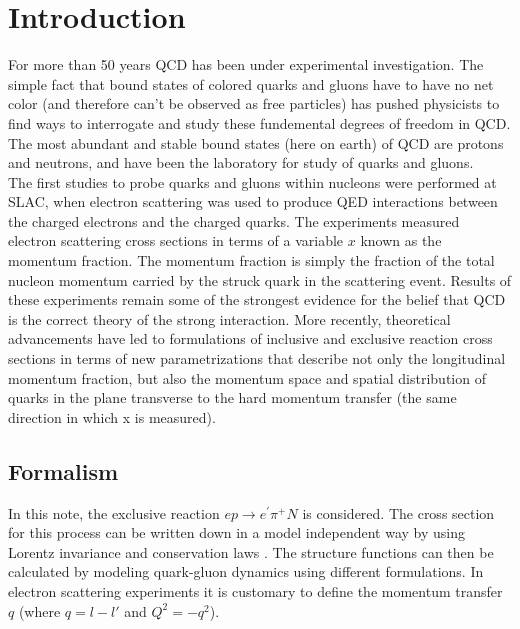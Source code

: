 \section{Introduction}


For more than 50 years QCD has been under experimental investigation.  The simple fact that bound states of colored quarks and gluons have to have no net color (and therefore can't be observed as free particles) has pushed physicists to find ways to interrogate and study these fundemental degrees of freedom in QCD.  The most abundant and stable bound states (here on earth) of QCD are protons and neutrons, and have been the laboratory for study of quarks and gluons. \\

The first studies to probe quarks and gluons within nucleons were performed at SLAC, when electron scattering was used to produce QED interactions between the charged electrons and the charged quarks.  The experiments measured electron scattering cross sections in terms of a variable $x$ known as the momentum fraction.  The momentum fraction is simply the fraction of the total nucleon momentum carried by the struck quark in the scattering event.  Results of these experiments remain some of the strongest evidence for the belief that QCD is the correct theory of the strong interaction. More recently, theoretical advancements have led to formulations of inclusive and exclusive reaction cross sections in terms of new parametrizations that describe not only the longitudinal momentum fraction, but also the momentum space and spatial distribution of quarks in the plane transverse to the hard momentum transfer (the same direction in which x is measured).  \\


\subsection{Formalism}
In this note, the exclusive reaction $e p \rightarrow e^\prime \pi^+ N$ is considered.  The cross section for this process can be written down in a model independent way by using Lorentz invariance and conservation laws \cite{drechsel-tiator}.  The structure functions can then be calculated by modeling quark-gluon dynamics using different formulations.  In electron scattering experiments it is customary to define the momentum transfer $q$ (where $q = l - l'$ and $Q^{2} = -q^{2}$). 

